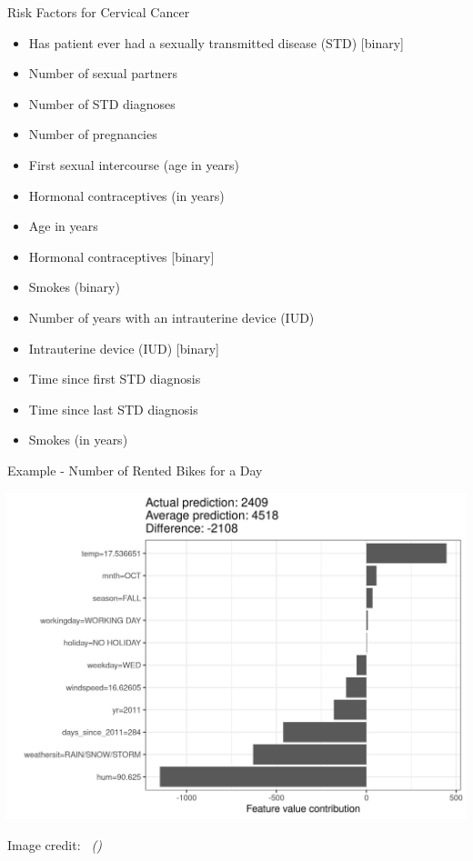 \documentclass[dvipsnames]{beamer}
\newcommand{\credit}[2]{\par\hfill \footnotesize #1 credit:~\itshape\citeauthor{#2} (\citeyear{#2})}
\begin{document}
\begin{frame}{Risk Factors for Cervical Cancer\footnotemark}
\begin{itemize}
	\item Has patient ever had a sexually transmitted disease (STD) [binary]
	\item Number of sexual partners
	\item Number of STD diagnoses
	\item Number of pregnancies
	\item First sexual intercourse (age in years)
	\item Hormonal contraceptives (in years)
	\item Age in years
	\item Hormonal contraceptives [binary]
	\item Smokes (binary)
	\item Number of years with an intrauterine device (IUD)
	\item Intrauterine device (IUD) [binary]
	\item Time since first STD diagnosis
	\item Time since last STD diagnosis
	\item Smokes (in years)
\end{itemize}
\end{frame}

\begin{frame}{Example - Number of Rented Bikes for a Day}
	\begin{center}
		\includegraphics[scale=0.6]{images/shapley-bike-plot-1.jpeg}
	\end{center}
	\credit{Image}{molnar2020interpretable}
\end{frame}
\end{document}

